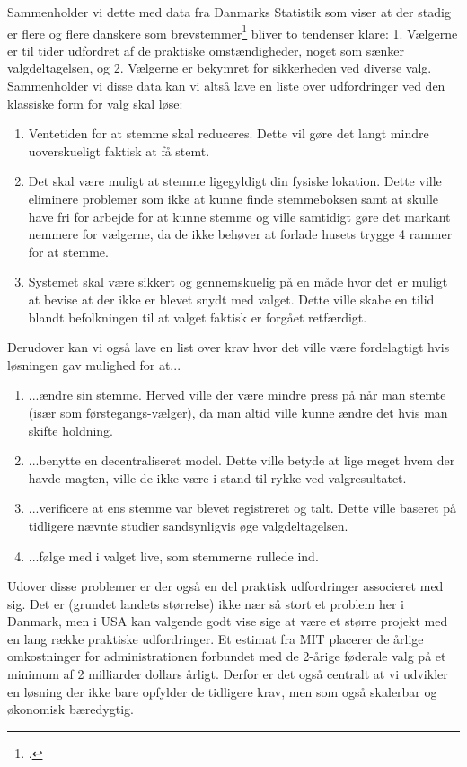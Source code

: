 \documentclass[a4paper, 8pt, oneside]{article} %
\begin{document}
Sammenholder vi dette med data fra Danmarks Statistik som viser at der stadig er flere og flere danskere som brevstemmer\footcite{nortoft_stadig_nodate} bliver to tendenser klare: 1. Vælgerne er til tider udfordret af de praktiske omstændigheder, noget som sænker valgdeltagelsen, og 2. Vælgerne er bekymret for sikkerheden ved diverse valg. Sammenholder vi disse data kan vi altså lave en liste over udfordringer ved den klassiske form for valg skal løse:

\begin{enumerate}
	\item Ventetiden for at stemme skal reduceres. Dette vil gøre det langt mindre uoverskueligt faktisk at få stemt.
	\item Det skal være muligt at stemme ligegyldigt din fysiske lokation. Dette ville eliminere problemer som ikke at kunne finde stemmeboksen samt at skulle have fri for arbejde for at kunne stemme og ville samtidigt gøre det markant nemmere for vælgerne, da de ikke behøver at forlade husets trygge 4 rammer for at stemme.
	\item Systemet skal være sikkert og gennemskuelig på en måde hvor det er muligt at bevise at der ikke er blevet snydt med valget. Dette ville skabe en tilid blandt befolkningen til at valget faktisk er forgået retfærdigt.
\end{enumerate}

Derudover kan vi også lave en list over krav hvor det ville være fordelagtigt hvis løsningen gav mulighed for at...

\begin{enumerate}
	\item ...ændre sin stemme. Herved ville der være mindre press på når man stemte (især som førstegangs-vælger), da man altid ville kunne ændre det hvis man skifte holdning.
	\item ...benytte en decentraliseret model. Dette ville betyde at lige meget hvem der havde magten, ville de ikke være i stand til rykke ved valgresultatet.
	\item ...verificere at ens stemme var blevet registreret og talt. Dette ville baseret på tidligere nævnte studier sandsynligvis øge valgdeltagelsen. 
	\item ...følge med i valget live, som stemmerne rullede ind.
\end{enumerate}

Udover disse problemer er der også en del praktisk udfordringer associeret med sig. Det er (grundet landets størrelse) ikke nær så stort et problem her i Danmark, men i USA kan valgende godt vise sige at være et større projekt med en lang række praktiske udfordringer. Et estimat fra MIT placerer de årlige omkostninger for administrationen forbundet med de 2-årige føderale valg på et minimum af 2 milliarder dollars årligt. Derfor er det også centralt at vi udvikler en løsning der ikke bare opfylder de tidligere krav, men som også skalerbar og økonomisk bæredygtig.
\end{document}

